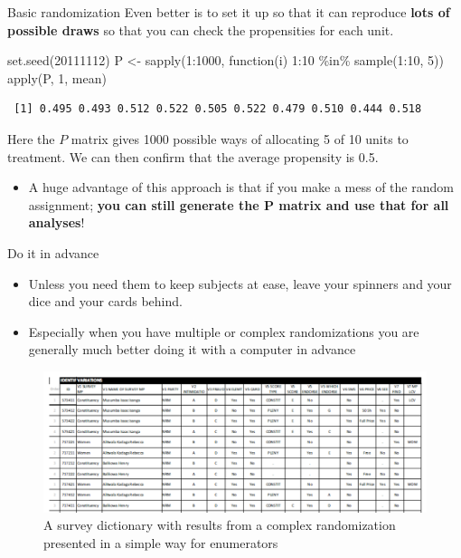 \documentclass[
  11pt,
  ignorenonframetext,
]{beamer}
\newenvironment{Shaded}{\begin{snugshade}}{\end{snugshade}}
\newcommand{\ControlFlowTok}[1]{\textcolor[rgb]{0.00,0.23,0.31}{#1}}
\newcommand{\DecValTok}[1]{\textcolor[rgb]{0.68,0.00,0.00}{#1}}
\newcommand{\FunctionTok}[1]{\textcolor[rgb]{0.28,0.35,0.67}{#1}}
\newcommand{\NormalTok}[1]{\textcolor[rgb]{0.00,0.23,0.31}{#1}}
\newcommand{\OtherTok}[1]{\textcolor[rgb]{0.00,0.23,0.31}{#1}}
\newcommand{\SpecialCharTok}[1]{\textcolor[rgb]{0.37,0.37,0.37}{#1}}
\providecommand{\tightlist}{%
  \setlength{\itemsep}{0pt}\setlength{\parskip}{0pt}}\usepackage{longtable,booktabs,array}
\begin{document}
\begin{frame}[fragile]{Basic randomization}
\protect\hypertarget{basic-randomization-1}{}
Even better is to set it up so that it can reproduce
\textbf{lots of possible draws} so that you can check the propensities
for each unit.

\begin{Shaded}
\begin{Highlighting}[]
\FunctionTok{set.seed}\NormalTok{(}\DecValTok{20111112}\NormalTok{)}
\NormalTok{P }\OtherTok{\textless{}{-}} \FunctionTok{sapply}\NormalTok{(}\DecValTok{1}\SpecialCharTok{:}\DecValTok{1000}\NormalTok{, }\ControlFlowTok{function}\NormalTok{(i) }\DecValTok{1}\SpecialCharTok{:}\DecValTok{10} \SpecialCharTok{\%in\%} \FunctionTok{sample}\NormalTok{(}\DecValTok{1}\SpecialCharTok{:}\DecValTok{10}\NormalTok{, }\DecValTok{5}\NormalTok{)) }
\FunctionTok{apply}\NormalTok{(P, }\DecValTok{1}\NormalTok{, mean)}
\end{Highlighting}
\end{Shaded}

\begin{verbatim}
 [1] 0.495 0.493 0.512 0.522 0.505 0.522 0.479 0.510 0.444 0.518
\end{verbatim}

Here the \(P\) matrix gives 1000 possible ways of allocating 5 of 10
units to treatment. We can then confirm that the average propensity is
0.5.

\begin{itemize}
\tightlist
\item
  A huge advantage of this approach is that if you make a mess of the
  random assignment;
  \textbf{you can still generate the P matrix and use that for all analyses}!
\end{itemize}
\end{frame}

\begin{frame}{Do it in advance}
\protect\hypertarget{do-it-in-advance}{}
\begin{itemize}
\tightlist
\item
  Unless you need them to keep subjects at ease, leave your spinners and
  your dice and your cards behind.
\item
  Especially when you have multiple or complex randomizations you are
  generally much better doing it with a computer in advance
\end{itemize}

\begin{figure}
\centering
\includegraphics[width=.8\linewidth]{figs/dictionary.png}
\caption{A survey dictionary with results from a complex randomization presented in a simple way for enumerators}
\label{fig:dictionary}
\end{figure}
\end{frame}
\end{document}
